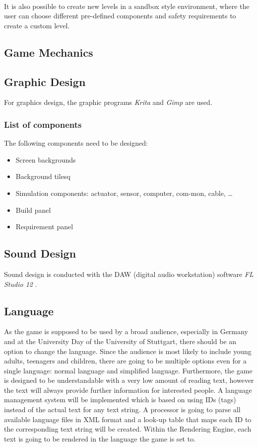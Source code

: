 \\

It is also possible to create new levels in a sandbox style environment, where the user can choose different pre-defined components and
safety requirements to create a custom level.

\subsection{Game Mechanics}\label{subsec:game-mechanics}

\subsection{Graphic Design}\label{subsec:graphic-design}
For graphics design, the graphic programs \textit{Krita} \cite{foundation_2020} and \textit{Gimp} \cite{gimp} are used.

\subsubsection{List of components}
The following components need to be designed:
\begin{itemize}
    \item Screen backgrounds
    \item Background tilesq
    \item Simulation components: actuator, sensor, computer, com-mon, cable, \ldots
    \item Build panel
    \item Requirement panel
\end{itemize}

\subsection{Sound Design}\label{subsec:sound-design}
Sound design is conducted with the DAW (digital audio workstation) software \textit{FL Studio 12} \cite{imageline}.

\subsection{Language}\label{subsec:language}
As the game is supposed to be used by a broad audience, especially in Germany and at the University Day of the University of Stuttgart, there should be an option
to change the language.
Since the audience is most likely to include young adults, teenagers and children, there are going to be multiple options even for a single language:
normal language and simplified language.
Furthermore, the game is designed to be understandable with a very low amount of reading text, however the text will always provide further information for interested people.
A language management system will be implemented which is based on using IDs (tags) instead of the actual text for any text string.
A processor is going to parse all available language files in XML format and a look-up table that maps each ID to the corresponding text string will be created.
Within the Rendering Engine, each text is going to be rendered in the language the game is set to.

